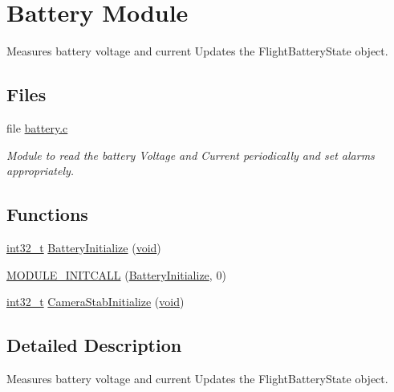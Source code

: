 \hypertarget{group___battery_module}{\section{Battery Module}
\label{group___battery_module}
}


Measures battery voltage and current Updates the Flight\-Battery\-State object.  


\subsection*{Files}
\begin{DoxyCompactItemize}
\item 
file \hyperlink{battery_8c}{battery.\-c}
\begin{DoxyCompactList}\small\item\em Module to read the battery Voltage and Current periodically and set alarms appropriately. \end{DoxyCompactList}\end{DoxyCompactItemize}
\subsection*{Functions}
\begin{DoxyCompactItemize}
\item 
\hyperlink{group___n_a_m_e_gafd12020da5a235dfcf0c3c748fb5baed}{int32\-\_\-t} \hyperlink{group___battery_module_ga578ae02a5a7f4b77431f4e4bcb5cc121}{Battery\-Initialize} (\hyperlink{group___n_a_m_e_ga18028b8badbf1ea7e704ccac3c488e82}{void})
\item 
\hyperlink{group___battery_module_gadf5b49c16adba3ff040e42ff05a35cc7}{M\-O\-D\-U\-L\-E\-\_\-\-I\-N\-I\-T\-C\-A\-L\-L} (\hyperlink{group___battery_module_ga578ae02a5a7f4b77431f4e4bcb5cc121}{Battery\-Initialize}, 0)
\item 
\hyperlink{group___n_a_m_e_gafd12020da5a235dfcf0c3c748fb5baed}{int32\-\_\-t} \hyperlink{group___battery_module_ga8bb94b51a3ec12f84fe0597c845ddd12}{Camera\-Stab\-Initialize} (\hyperlink{group___n_a_m_e_ga18028b8badbf1ea7e704ccac3c488e82}{void})
\end{DoxyCompactItemize}


\subsection{Detailed Description}
Measures battery voltage and current Updates the Flight\-Battery\-State object. 

